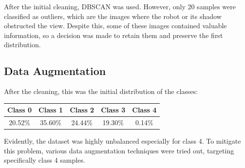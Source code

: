 \documentclass[11pt]{article}
\begin{document}
\begin{multicols}{2}
        

        
        After the initial cleaning, DBSCAN \cite{ester1996density} was used.
        However, only 20 samples were classified as outliers, which are the images where the robot or its shadow obstructed the view. Despite this, some of these images contained valuable information, so a decision was made to retain them and preserve the first distribution.

        
        \subsection{Data Augmentation}
        \label{sec:aug}
        After the cleaning, this was the initial distribution of the classes: 

        \begin{table}[H]
        \begin{tabular}{|c|c|c|c|c|}
        \hline
        \rowcolor[HTML]{C0C0C0} 
        Class 0 & Class 1 & Class 2 & Class 3 & Class 4 \\ \hline
        20.52\% & 35.60\% & 24.44\% & 19.30\% & 0.14\%  \\ \hline
        \end{tabular}
        \end{table}
        
        Evidently, the dataset was highly unbalanced especially for class 4. To mitigate this problem, various data augmentation techniques were tried out, targeting specifically class 4 samples.


\end{multicols}
\end{document}
